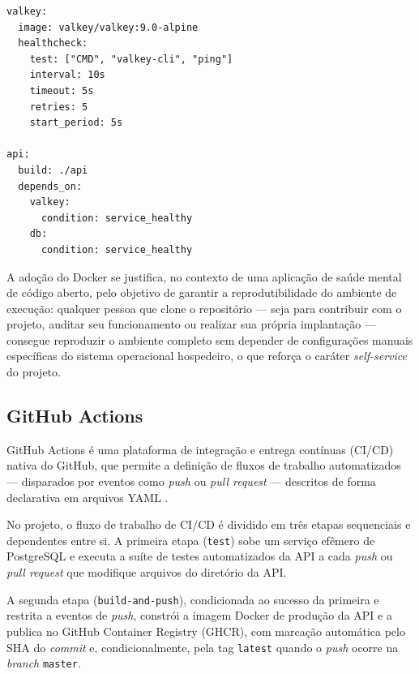 \begin{lstlisting}[caption={Configuração do \textit{healthcheck} do Valkey e de dependência condicional da API no \texttt{docker-compose.yml}}, label={lst:healthcheck-compose}]
valkey:
  image: valkey/valkey:9.0-alpine
  healthcheck:
    test: ["CMD", "valkey-cli", "ping"]
    interval: 10s
    timeout: 5s
    retries: 5
    start_period: 5s

api:
  build: ./api
  depends_on:
    valkey:
      condition: service_healthy
    db:
      condition: service_healthy
\end{lstlisting}


A adoção do Docker se justifica, no contexto de uma aplicação de saúde
mental de código aberto, pelo objetivo de garantir a reprodutibilidade do
ambiente de execução: qualquer pessoa que clone o repositório --- seja para
contribuir com o projeto, auditar seu funcionamento ou realizar sua própria
implantação --- consegue reproduzir o ambiente completo sem depender de
configurações manuais específicas do sistema operacional hospedeiro, o que
reforça o caráter \textit{self-service} do projeto.

\subsection{GitHub Actions}

GitHub Actions é uma plataforma de integração e entrega contínuas (CI/CD)
nativa do GitHub, que permite a definição de fluxos de trabalho automatizados
--- disparados por eventos como \textit{push} ou \textit{pull request} ---
descritos de forma declarativa em arquivos YAML \citep{githubactions:2026}.

No projeto, o fluxo de trabalho de CI/CD é dividido em três etapas
sequenciais e dependentes entre si. A primeira etapa (\texttt{test}) sobe um
serviço efêmero de PostgreSQL e executa a suíte de testes automatizados da
API a cada \textit{push} ou \textit{pull request} que modifique arquivos do
diretório da API.

A segunda etapa (\texttt{build-and-push}), condicionada ao
sucesso da primeira e restrita a eventos de \textit{push}, constrói a imagem
Docker de produção da API e a publica no GitHub Container Registry (GHCR),
com marcação automática pelo SHA do \textit{commit} e, condicionalmente, pela
tag \texttt{latest} quando o \textit{push} ocorre na \textit{branch}
\texttt{master}.

